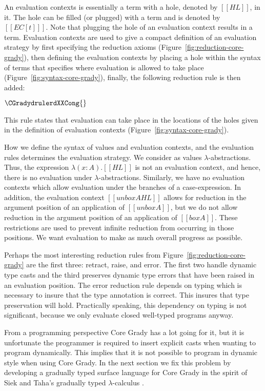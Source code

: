 An evaluation contexts is essentially a term with a hole, denoted by
$[[HL]]$, in it.  The hole can be filled (or plugged) with a term and
is denoted by $[[EC[t] ]]$.  Note that plugging the hole of an
evaluation context results in a term.  Evaluation contexts are used to
give a compact definition of an evaluation strategy by first specifying
the reduction axioms (Figure~\ref{fig:reduction-core-grady}), then
defining the evaluation contexts by placing a hole within the syntax
of terms that specifies where evaluation is allowed to take place
(Figure~\ref{fig:syntax-core-grady}), finally, the following reduction
rule is then added:
\begin{center}\small
  \begin{math}
    \CGradydrulerdXXCong{}
  \end{math}
\end{center}
This rule states that evaluation can take place in the locations of
the holes given in the definition of evaluation contexts
(Figure~\ref{fig:syntax-core-grady}).

How we define the syntax of values and evaluation contexts, and the
evaluation rules determines the evaluation strategy.  We consider as
values $\lambda$-abstractions. Thus, the expression $\lambda
(x:A).[[HL]]$ is not an evaluation context, and hence, there is no
evaluation under $\lambda$-abstractions.  Similarly, we have no
evaluation contexts which allow evaluation under the branches of a
case-expression.  In addition, the evaluation context $[[unbox A HL]]$
allows for reduction in the argument position of an application of
$[[unbox A]]$, but we do not allow reduction in the argument position
of an application of $[[box A]]$. These restrictions are used to
prevent infinite reduction from occurring in those positions.  We want
evaluation to make as much overall progress as possible.

Perhaps the most interesting reduction rules from
Figure~\ref{fig:reduction-core-grady} are the first three: retract,
raise, and error.  The first two handle dynamic type casts and the
third preserves dynamic type errors that have been raised in an
evaluation position.  The error reduction rule depends on typing which
is necessary to insure that the type annotation is correct.  This
insures that type preservation will hold.  Practically speaking, this
dependency on typing is not significant, because we only evaluate
closed well-typed programs anyway.

From a programming perspective Core Grady has a lot going for it, but
it is unfortunate the programmer is required to insert explicit casts
when wanting to program dynamically.  This implies that it is not
possible to program in dynamic style when using Core Grady.  In the
next section we fix this problem by developing a gradually typed
surface language for Core Grady in the spirit of Siek and Taha's
gradually typed $\lambda$-calculus \cite{Siek:2006,Siek:2015}.


